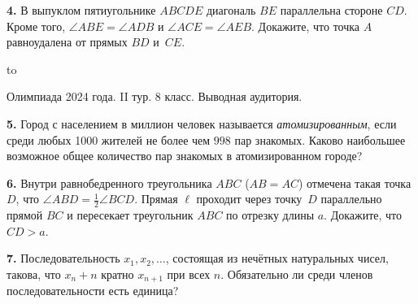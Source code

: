\documentclass[12pt]{article}
\def\q#1.{{\bf #1. }}
\def\dotline{\smallskip\hbox to \hsize{\dotfill}\medskip}
\begin{document}
\q4. В выпуклом пятиугольнике $ABCDE$ диагональ $BE$ параллельна стороне 
$CD$. Кроме того, $\angle ABE=\angle ADB$ и $\angle ACE=\angle AEB$. 
Докажите, что точка $A$ равноудалена от прямых $BD$ и~$CE$.

\dotline

\centerline{Олимпиада 2024 года. II тур. 8 класс. Выводная аудитория.}
\smallskip

\q5. Город с населением в миллион человек
называется \emph{атомизированным}, если среди любых 1000 жителей
не более чем $998$ пар знакомых. Каково наибольшее
возможное общее количество пар знакомых в 
атомизированном городе? 

\q6. Внутри равнобедренного треугольника $ABC$ ($AB=AC$) отмечена такая точка $D$, что $\angle ABD = \frac12 \angle BCD$. Прямая $\ell$ проходит через точку~$D$ параллельно прямой $BC$ и пересекает треугольник $ABC$ по отрезку длины $a$. Докажите, что $CD>a$. 

\q7. Последовательность $x_1,x_2,\ldots$, состоящая из нечётных натуральных чисел, 
такова, что $x_n+n$ кратно $x_{n+1}$
при всех $n$. Обязательно ли среди членов последовательности есть единица?
\end{document}
